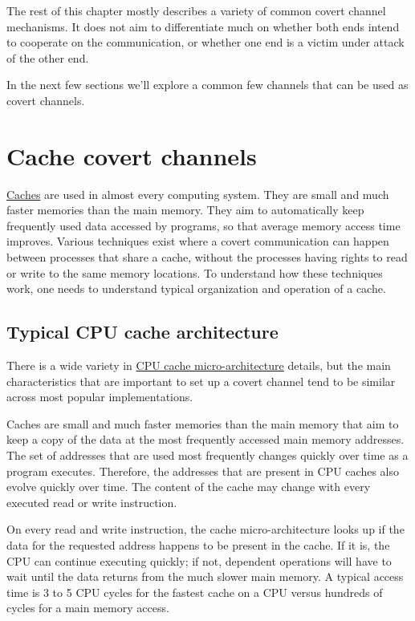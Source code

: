 \documentclass[a4paper,]{report}
\begin{document}
The rest of this chapter mostly describes a variety of common covert
channel mechanisms. It does not aim to differentiate much on whether
both ends intend to cooperate on the communication, or whether one end
is a victim under attack of the other end.

In the next few sections we'll explore a common few channels that can be
used as covert channels.

\hypertarget{cache-covert-channels}{%
\section{Cache covert channels}\label{cache-covert-channels}}

\href{https://en.wikipedia.org/wiki/Cache_(computing)}{Caches}
are used in almost every computing system. They are small and much
faster memories than the main memory. They aim to automatically keep
frequently used data accessed by programs, so that average memory access
time improves. Various techniques exist where a covert communication can
happen between processes that share a cache, without the processes
having rights to read or write to the same memory locations. To
understand how these techniques work, one needs to understand typical
organization and operation of a cache.

\hypertarget{typical-cpu-cache-architecture}{%
\subsection{Typical CPU cache
architecture}\label{typical-cpu-cache-architecture}}

There is a wide variety in
\href{https://en.wikipedia.org/wiki/CPU_cache}{CPU cache
micro-architecture} details, but the main characteristics that are
important to set up a covert channel tend to be similar across most
popular implementations.

Caches are small and much faster memories than the main memory that aim
to keep a copy of the data at the most frequently accessed main memory
addresses. The set of addresses that are used most frequently changes
quickly over time as a program executes. Therefore, the addresses that
are present in CPU caches also evolve quickly over time. The content of
the cache may change with every executed read or write instruction.

On every read and write instruction, the cache micro-architecture looks
up if the data for the requested address happens to be present in the
cache. If it is, the CPU can continue executing quickly; if not,
dependent operations will have to wait until the data returns from the
much slower main memory. A typical access time is 3 to 5 CPU cycles for
the fastest cache on a CPU versus hundreds of cycles for a main memory
access.
\end{document}
